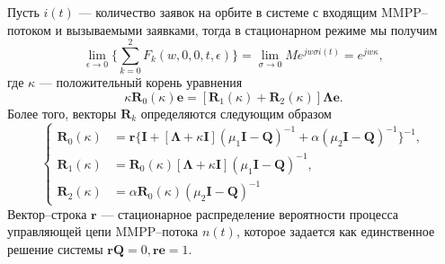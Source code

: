 \begin{theorem} \label{R_theorem}
	Пусть $i(t)$ --- количество заявок на орбите в системе с входящим MMPP--потоком и вызываемыми заявками, тогда в стационарном режиме мы получим
	\begin{equation*}
		\lim_{\epsilon \xrightarrow{} 0}\{\sum_{k=0}^{2}F_{k}(w,0,0,t,\epsilon)\} = \lim_{\sigma \xrightarrow{} 0} M e^{jw\sigma i(t)} = e^{jw\kappa},
	\end{equation*}
где $\kappa$ --- положительный корень уравнения
\begin{equation*}
	\kappa \boldsymbol{R}_{0}(\kappa)\boldsymbol{e} = [\boldsymbol{R}_{1}(\kappa) + \boldsymbol{R}_{2}(\kappa)]\boldsymbol{\Lambda}\boldsymbol{e}.
\end{equation*}
Более того, векторы $\boldsymbol{R}_{k}$ определяются следующим образом
\begin{equation*}
	\left\{
	\begin{aligned}
		\boldsymbol{R}_{0}(\kappa) & = \boldsymbol{r}\{\boldsymbol{I} + [\boldsymbol{\Lambda} + \kappa\boldsymbol{I}](\mu_{1}\boldsymbol{I}-\boldsymbol{Q})^{-1}+\alpha(\mu_{2}\boldsymbol{I}-\boldsymbol{Q})^{-1}\}^{-1},\\
		\boldsymbol{R}_{1}(\kappa) & = \boldsymbol{R}_{0}(\kappa)[\boldsymbol{\Lambda} + \kappa\boldsymbol{I}](\mu_{1}\boldsymbol{I} - \boldsymbol{Q})^{-1},\\
		\boldsymbol{R}_{2}(\kappa) & = \alpha\boldsymbol{R}_{0}(\kappa)(\mu_{2}\boldsymbol{I} - \boldsymbol{Q})^{-1}
	\end{aligned}
\right.
\end{equation*}
Вектор--строка $\boldsymbol{r}$ --- стационарное распределение вероятности процесса управляющей цепи MMPP--потока $n(t)$, которое задается как единственное решение системы $\boldsymbol{r}\boldsymbol{Q} =0, \boldsymbol{r}\boldsymbol{e} = 1$.
\end{theorem}
